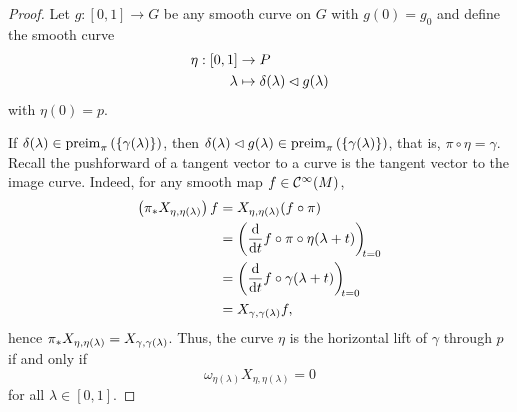 \begin{proof}
    Let \(g : [0,1] \to G\) be any smooth curve on \(G\) with \(g(0) = g_0\) and define the smooth curve
    \begin{align*}
        \eta : [0,1] &\to P\\
             \lambda &\mapsto \delta(\lambda) \mathbin{\vartriangleleft} g(\lambda)
    \end{align*}
    with \(\eta(0) = p\).

    If \(\delta(\lambda) \in \operatorname{preim}_{\pi}{\left(\{\gamma(\lambda)\}\right)}\), then \(\delta(\lambda) \mathbin{\vartriangleleft} g(\lambda) \in \operatorname{preim}_{\pi}{\left(\{\gamma(\lambda)\}\right)}\), that is, \(\pi \circ \eta = \gamma\). Recall the pushforward of a tangent vector to a curve is the tangent vector to the image curve. Indeed, for any smooth map \(f \in \mathcal{C}^\infty(M)\),
    \begin{align*}
        \left(\pf{\pi}{X_{\eta,\eta(\lambda)}}\right)f &= X_{\eta,\eta(\lambda)}(f \circ \pi)\\
                                                       &= \diff*{f \circ \pi \circ \eta(\lambda + t)}{t}[t=0]\\
                                                       &= \diff*{f \circ \gamma (\lambda + t)}{t}[t=0]\\
                                                       &= X_{\gamma,\gamma(\lambda)}f,
    \end{align*}
    hence \({\pi}_{\ast{}}{X_{\eta,\eta(\lambda)}}=X_{\gamma,\gamma(\lambda)}\). Thus, the curve \(\eta\) is the horizontal lift of \(\gamma\) through \(p\) if and only if
    \begin{equation*}
        \omega_{\eta(\lambda)}X_{\eta, \eta(\lambda)} = 0
    \end{equation*}
    for all \(\lambda \in [0,1].\)


\end{proof}
